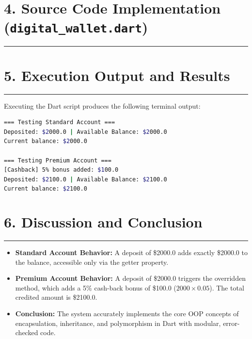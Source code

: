 \documentclass[11pt,a4paper]{article}
\begin{document}
\newpage

\section*{4. Source Code Implementation (\texttt{digital\_wallet.dart})}
\noindent\rule{\textwidth}{0.5pt}\vspace{0.2cm}



\newpage

\section*{5. Execution Output and Results}
\noindent\rule{\textwidth}{0.5pt}\vspace{0.2cm}

Executing the Dart script produces the following terminal output:

\vspace{0.2cm}
\begin{lstlisting}[language=bash, basicstyle=\ttfamily\small, frame=single, backgroundcolor=\color{black!5}]
=== Testing Standard Account ===
Deposited: $2000.0 | Available Balance: $2000.0
Current balance: $2000.0

=== Testing Premium Account ===
[Cashback] 5% bonus added: $100.0
Deposited: $2100.0 | Available Balance: $2100.0
Current balance: $2100.0
\end{lstlisting}

\vspace{0.4cm}
\section*{6. Discussion and Conclusion}
\noindent\rule{\textwidth}{0.5pt}\vspace{0.15cm}

\begin{itemize}
    \setlength{\itemsep}{5pt}
    \item \textbf{Standard Account Behavior:} A deposit of \$2000.0 adds exactly \$2000.0 to the balance, accessible only via the getter property.
    \item \textbf{Premium Account Behavior:} A deposit of \$2000.0 triggers the overridden method, which adds a 5\% cash-back bonus of \$100.0 ($2000 \times 0.05$). The total credited amount is \$2100.0.
    \item \textbf{Conclusion:} The system accurately implements the core OOP concepts of encapsulation, inheritance, and polymorphism in Dart with modular, error-checked code.
\end{itemize}
\end{document}
